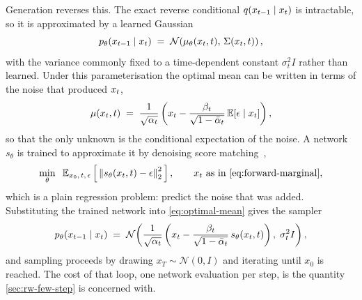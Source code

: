 Generation reverses this. The exact reverse conditional
$q(x_{t-1} \mid x_t)$ is intractable, so it is approximated by a learned
Gaussian
\begin{equation}
  p_\theta(x_{t-1} \mid x_t) \;=\; \mathcal{N}\!\left(\mu_\theta(x_t,t),\, \Sigma(x_t,t)\right),
\end{equation}
with the variance commonly fixed to a time-dependent constant
$\sigma_t^2 I$ rather than learned. Under this parameterisation the optimal
mean can be written in terms of the noise that produced $x_t$,
\begin{equation}
  \label{eq:optimal-mean}
  \mu(x_t, t) \;=\; \frac{1}{\sqrt{\alpha_t}}\left(x_t - \frac{\beta_t}{\sqrt{1-\bar{\alpha}_t}}\, \mathbb{E}\!\left[\epsilon \mid x_t\right]\right),
\end{equation}
so that the only unknown is the conditional expectation of the noise. A
network $s_\theta$ is trained to approximate it by denoising score
matching~\citep{song2019ncsn},
\begin{equation}
  \label{eq:dsm}
  \min_\theta \;\; \mathbb{E}_{x_0,\,t,\,\noisepred}
  \left[\, \left\lVert s_\theta(\xt, t) - \noisepred \right\rVert_2^2 \,\right],
  \qquad \xt \text{ as in \cref{eq:forward-marginal}},
\end{equation}
which is a plain regression problem: predict the noise that was added.
Substituting the trained network into \cref{eq:optimal-mean} gives the
sampler
\begin{equation}
  \label{eq:reverse-sampler}
  p_\theta(x_{t-1}\mid x_t) \;=\; \mathcal{N}\!\left(\frac{1}{\sqrt{\alpha_t}}\left(x_t - \frac{\beta_t}{\sqrt{1-\bar{\alpha}_t}}\,s_\theta(x_t,t)\right),\; \sigma_t^2 I\right),
\end{equation}
and sampling proceeds by drawing $x_T \sim \mathcal{N}(0,I)$ and iterating
until $x_0$ is reached. The cost of that loop, one network evaluation per
step, is the quantity \cref{sec:rw-few-step} is concerned with.

